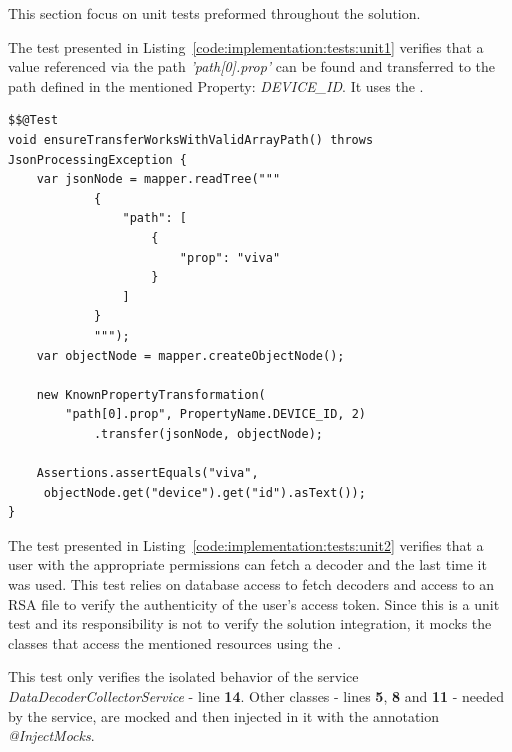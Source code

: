 This section focus on unit tests preformed throughout the solution.

The test presented in Listing~\ref{code:implementation:tests:unit1} verifies that a value referenced via the path \textit{'path[0].prop'} can be found and transferred to the path defined in the mentioned Property: \textit{DEVICE\_ID}.
It uses the .

\begin{lstlisting}[style=Java, caption=Unit Test Example in \textit{iot-core} package, label={code:implementation:tests:unit1}]
$$@Test
void ensureTransferWorksWithValidArrayPath() throws JsonProcessingException {
    var jsonNode = mapper.readTree("""
            {
                "path": [
                    {
                        "prop": "viva"
                    }
                ]
            }
            """);
    var objectNode = mapper.createObjectNode();

    new KnownPropertyTransformation(
        "path[0].prop", PropertyName.DEVICE_ID, 2)
            .transfer(jsonNode, objectNode);

    Assertions.assertEquals("viva",
     objectNode.get("device").get("id").asText());
}
\end{lstlisting}

The test presented in Listing~\ref{code:implementation:tests:unit2} verifies that a user with the appropriate permissions can fetch a decoder and the last time it was used. This test relies on database access to fetch decoders and access to an RSA file to verify the authenticity of the user's access token. Since this is a unit test and its responsibility is not to verify the solution integration, it mocks the classes that access the mentioned resources using the .

This test only verifies the isolated behavior of the service \textit{DataDecoderCollectorService} - line \textbf{14}. Other classes - lines \textbf{5}, \textbf{8} and \textbf{11} - needed by the service, are mocked and then injected in it with the annotation \textit{@InjectMocks}.

